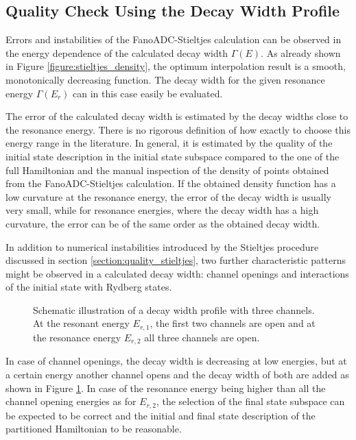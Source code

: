 \subsection{Quality Check Using the Decay Width Profile}
\label{section:Stieltjes_profile_properties}
Errors and instabilities of the FanoADC-Stieltjes calculation can be observed
in the energy dependence of the calculated decay width $\Gamma(E)$.
As already shown in Figure \ref{figure:stieltjes_density}, the optimum
interpolation result is a smooth, monotonically decreasing function.
The decay width for the given resonance energy $\Gamma(E_r)$ can in this case 
easily be evaluated.

The error of the calculated decay width is estimated by the decay widths
close to the resonance energy.
There is no rigorous definition
of how exactly to choose this energy range in the literature. 
In general, it is estimated
by the quality of the initial state description in the initial
state subspace compared to the one of the full Hamiltonian and the
manual inspection of the density of points obtained
from the FanoADC-Stieltjes calculation. If
the obtained density function has a low curvature at the resonance energy,
the error of the decay width is usually very small, while for resonance
energies, where the decay width has a high curvature, the error can be of the same
order as the obtained decay width.

In addition to numerical instabilities introduced by the Stieltjes procedure
discussed in section \ref{section:quality_stieltjes},
two further characteristic patterns might be observed in a calculated
decay width: channel openings and interactions of the initial state
with Rydberg states.


\begin{figure}[h]
  \centering
  
  \caption{Schematic illustration of a decay width profile with three
           channels. At the resonant energy $E_{r,1}$, the first two channels
           are open and at the resonance energy $E_{r,2}$ all three channels
           are open.}
  \label{figure:prof_channel_opening}
\end{figure}
In case of channel openings, the decay width is decreasing at low energies, but
at a certain energy another channel opens and the decay width of both are
added as shown in Figure \ref{figure:prof_channel_opening}. In case of the
resonance energy being higher than all the channel opening energies as for
$E_{r,2}$, the
selection of the final state subspace can be expected to be correct
and the initial
and final state description of the partitioned Hamiltonian to be reasonable.

